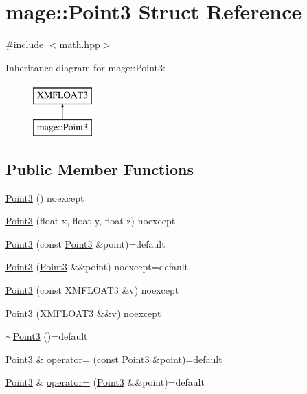 \hypertarget{structmage_1_1_point3}{}\section{mage\+:\+:Point3 Struct Reference}
\label{structmage_1_1_point3}


{\ttfamily \#include $<$math.\+hpp$>$}

Inheritance diagram for mage\+:\+:Point3\+:\begin{figure}[H]
\begin{center}
\leavevmode
\includegraphics[height=2.000000cm]{structmage_1_1_point3}
\end{center}
\end{figure}
\subsection*{Public Member Functions}
\begin{DoxyCompactItemize}
\item 
\hyperlink{structmage_1_1_point3_aab371cb187cadc61b81e5d09c8eed1e5}{Point3} () noexcept
\item 
\hyperlink{structmage_1_1_point3_a33663fd8953e6060c0d25bb32f7a8aec}{Point3} (float x, float y, float z) noexcept
\item 
\hyperlink{structmage_1_1_point3_a065622ec6feed651661b5b55aa616a75}{Point3} (const \hyperlink{structmage_1_1_point3}{Point3} \&point)=default
\item 
\hyperlink{structmage_1_1_point3_a42d100496c00031d597f00da9057b221}{Point3} (\hyperlink{structmage_1_1_point3}{Point3} \&\&point) noexcept=default
\item 
\hyperlink{structmage_1_1_point3_a301b7497bfdc583b0157d4dcb10e0984}{Point3} (const X\+M\+F\+L\+O\+A\+T3 \&v) noexcept
\item 
\hyperlink{structmage_1_1_point3_a56b75e7d5d8803ffd2c3b11f087816d1}{Point3} (X\+M\+F\+L\+O\+A\+T3 \&\&v) noexcept
\item 
\hyperlink{structmage_1_1_point3_a952151b6ff72b68569f95445c2ac2495}{$\sim$\+Point3} ()=default
\item 
\hyperlink{structmage_1_1_point3}{Point3} \& \hyperlink{structmage_1_1_point3_a9b2178183cdb9e8d1ab6eaf9702b0786}{operator=} (const \hyperlink{structmage_1_1_point3}{Point3} \&point)=default
\item 
\hyperlink{structmage_1_1_point3}{Point3} \& \hyperlink{structmage_1_1_point3_ab3a12f78a196535f25269e1288b10a06}{operator=} (\hyperlink{structmage_1_1_point3}{Point3} \&\&point)=default
\end{DoxyCompactItemize}


